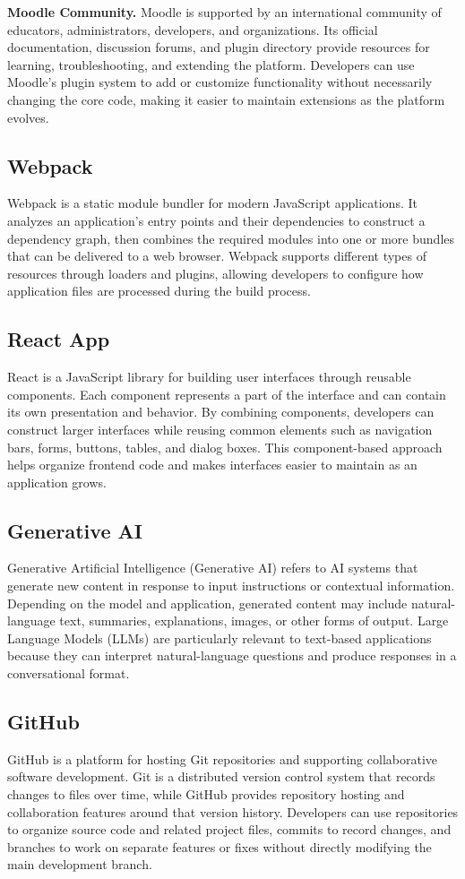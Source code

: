\medskip
\noindent\textbf{Moodle Community.} Moodle is supported by an international community of educators, administrators, developers, and organizations. Its official documentation, discussion forums, and plugin directory provide resources for learning, troubleshooting, and extending the platform. Developers can use Moodle's plugin system to add or customize functionality without necessarily changing the core code, making it easier to maintain extensions as the platform evolves.

\subsection{Webpack}
Webpack is a static module bundler for modern JavaScript applications. It analyzes an application's entry points and their dependencies to construct a dependency graph, then combines the required modules into one or more bundles that can be delivered to a web browser. Webpack supports different types of resources through loaders and plugins, allowing developers to configure how application files are processed during the build process.

\subsection{React App}
React is a JavaScript library for building user interfaces through reusable components. Each component represents a part of the interface and can contain its own presentation and behavior. By combining components, developers can construct larger interfaces while reusing common elements such as navigation bars, forms, buttons, tables, and dialog boxes. This component-based approach helps organize frontend code and makes interfaces easier to maintain as an application grows.

\subsection{Generative AI}
Generative Artificial Intelligence (Generative AI) refers to AI systems that generate new content in response to input instructions or contextual information. Depending on the model and application, generated content may include natural-language text, summaries, explanations, images, or other forms of output. Large Language Models (LLMs) are particularly relevant to text-based applications because they can interpret natural-language questions and produce responses in a conversational format.


\subsection{GitHub}
GitHub is a platform for hosting Git repositories and supporting collaborative software development. Git is a distributed version control system that records changes to files over time, while GitHub provides repository hosting and collaboration features around that version history. Developers can use repositories to organize source code and related project files, commits to record changes, and branches to work on separate features or fixes without directly modifying the main development branch.
